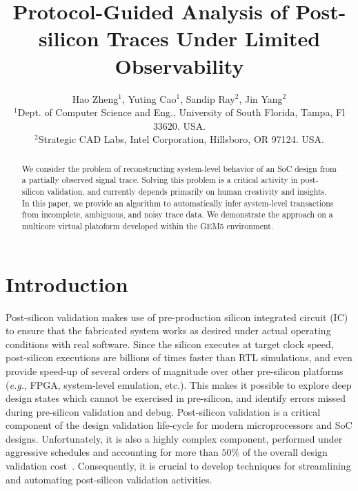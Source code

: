 \documentclass[conference]{IEEEtran}
\title{\Large {\bf Protocol-Guided Analysis of Post-silicon
  Traces Under Limited Observability}}
\author{\large Hao Zheng$^1$, Yuting Cao$^1$, Sandip Ray$^2$, Jin Yang$^2$ \\
 $^1$Dept. of Computer Science and Eng., University of South Florida, Tampa, Fl 33620. USA. \\
 $^2$Strategic CAD Labs, Intel Corporation, Hillsboro, OR 97124.  USA.}
\newcommand{\eg}{\mbox{{\em e.g.}}}
\begin{document}
\maketitle

\begin{abstract}
We consider the problem of reconstructing system-level
behavior of an SoC design from a partially observed signal
trace.  Solving this problem is a critical activity in
post-silicon validation, and currently depends primarily on
human creativity and insights.  In this paper, we provide an
algorithm to automatically infer system-level transactions
from incomplete, ambiguous, and noisy trace data.  We
demonstrate the approach on a multicore virtual platoform
developed within the GEM5 environment.
\end{abstract}

\section{Introduction}

Post-silicon validation makes use of pre-production silicon
integrated circuit (IC) to ensure that the fabricated system
works as desired under actual operating conditions with real
software.  Since the silicon executes at target clock speed,
post-silicon executions are billions of times faster than
RTL simulations, and even provide speed-up of several orders
of magnitude over other pre-silicon platforms (\eg, FPGA,
system-level emulation, etc.).  This makes it possible to
explore deep design states which cannot be exercised in
pre-silicon, and identify errors missed during pre-silicon
validation and debug.  Post-silicon validation is a critical
component of the design validation life-cycle for modern
microprocessors and SoC designs.  Unfortunately, it is also
a highly complex component, performed under aggressive
schedules and accounting for more than $50\%$ of the overall
design validation cost~\cite{Patra2007}.  Consequently, it
is crucial to develop techniques for streamlining and
automating post-silicon validation activities.
\end{document}
